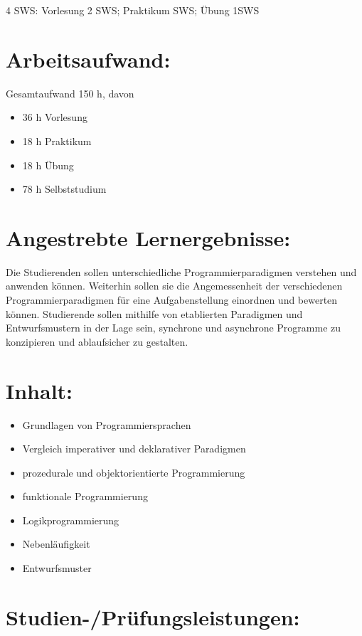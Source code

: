 4 SWS: Vorlesung 2 SWS; Praktikum SWS; Übung 1SWS

\section*{Arbeitsaufwand:}\label{arbeitsaufwand-16}

Gesamtaufwand 150 h, davon

\begin{itemize}
\tightlist
\item
  36 h Vorlesung
\item
  18 h Praktikum
\item
  18 h Übung
\item
  78 h Selbststudium
\end{itemize}

\section*{Angestrebte
Lernergebnisse:}\label{angestrebte-lernergebnisse-17}

Die Studierenden sollen unterschiedliche Programmierparadigmen verstehen
und anwenden können. Weiterhin sollen sie die Angemessenheit der
verschiedenen Programmierparadigmen für eine Aufgabenstellung einordnen
und bewerten können. Studierende sollen mithilfe von etablierten
Paradigmen und Entwurfsmustern in der Lage sein, synchrone und
asynchrone Programme zu konzipieren und ablaufsicher zu gestalten.

\section*{Inhalt:}\label{inhalt-17}

\begin{itemize}
\tightlist
\item
  Grundlagen von Programmiersprachen
\item
  Vergleich imperativer und deklarativer Paradigmen
\item
  prozedurale und objektorientierte Programmierung
\item
  funktionale Programmierung
\item
  Logikprogrammierung
\item
  Nebenläufigkeit
\item
  Entwurfsmuster
\end{itemize}

\section*{Studien-/Prüfungsleistungen:}\label{studien-pruxfcfungsleistungen-15}

